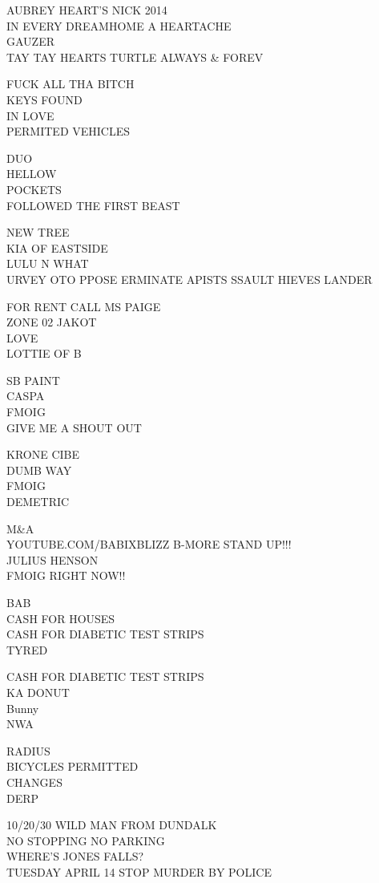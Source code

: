 \documentclass[10pt,letterpaper]{article}
\begin{document}
AUBREY HEART'S NICK 2014\\
IN EVERY DREAMHOME A HEARTACHE\\
GAUZER\\
TAY TAY HEARTS TURTLE ALWAYS \& FOREV

FUCK ALL THA BITCH\\
KEYS FOUND\\
IN LOVE\\
PERMITED VEHICLES

DUO\\
HELLOW\\
POCKETS\\
FOLLOWED THE FIRST BEAST

NEW TREE\\
KIA OF EASTSIDE\\
LULU N WHAT\\
URVEY OTO PPOSE ERMINATE APISTS SSAULT HIEVES LANDER

FOR RENT CALL MS PAIGE\\
ZONE 02 JAKOT\\
LOVE\\
LOTTIE OF B

SB PAINT\\
CASPA\\
FMOIG\\
GIVE ME A SHOUT OUT

KRONE CIBE\\
DUMB WAY\\
FMOIG\\
DEMETRIC

M\&A\\
YOUTUBE.COM/BABIXBLIZZ B{-}MORE STAND UP!!!\\
JULIUS HENSON\\
FMOIG RIGHT NOW!!

BAB\\
CASH FOR HOUSES\\
CASH FOR DIABETIC TEST STRIPS\\
TYRED

CASH FOR DIABETIC TEST STRIPS\\
KA DONUT\\
Bunny\\
NWA

RADIUS\\
BICYCLES PERMITTED\\
CHANGES\\
DERP

10/20/30 WILD MAN FROM DUNDALK\\
NO STOPPING NO PARKING\\
WHERE'S JONES FALLS?\\
TUESDAY APRIL 14 STOP MURDER BY POLICE
\end{document}
